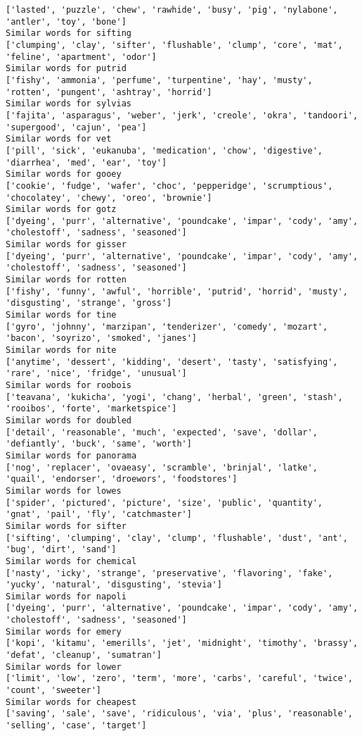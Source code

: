 \documentclass[11pt]{article}
\begin{document}
\begin{Verbatim}[commandchars=\\\{\}]
['lasted', 'puzzle', 'chew', 'rawhide', 'busy', 'pig', 'nylabone', 'antler', 'toy', 'bone']
Similar words for sifting
['clumping', 'clay', 'sifter', 'flushable', 'clump', 'core', 'mat', 'feline', 'apartment', 'odor']
Similar words for putrid
['fishy', 'ammonia', 'perfume', 'turpentine', 'hay', 'musty', 'rotten', 'pungent', 'ashtray', 'horrid']
Similar words for sylvias
['fajita', 'asparagus', 'weber', 'jerk', 'creole', 'okra', 'tandoori', 'supergood', 'cajun', 'pea']
Similar words for vet
['pill', 'sick', 'eukanuba', 'medication', 'chow', 'digestive', 'diarrhea', 'med', 'ear', 'toy']
Similar words for gooey
['cookie', 'fudge', 'wafer', 'choc', 'pepperidge', 'scrumptious', 'chocolatey', 'chewy', 'oreo', 'brownie']
Similar words for gotz
['dyeing', 'purr', 'alternative', 'poundcake', 'impar', 'cody', 'amy', 'cholestoff', 'sadness', 'seasoned']
Similar words for gisser
['dyeing', 'purr', 'alternative', 'poundcake', 'impar', 'cody', 'amy', 'cholestoff', 'sadness', 'seasoned']
Similar words for rotten
['fishy', 'funny', 'awful', 'horrible', 'putrid', 'horrid', 'musty', 'disgusting', 'strange', 'gross']
Similar words for tine
['gyro', 'johnny', 'marzipan', 'tenderizer', 'comedy', 'mozart', 'bacon', 'soyrizo', 'smoked', 'janes']
Similar words for nite
['anytime', 'dessert', 'kidding', 'desert', 'tasty', 'satisfying', 'rare', 'nice', 'fridge', 'unusual']
Similar words for roobois
['teavana', 'kukicha', 'yogi', 'chang', 'herbal', 'green', 'stash', 'rooibos', 'forte', 'marketspice']
Similar words for doubled
['detail', 'reasonable', 'much', 'expected', 'save', 'dollar', 'defiantly', 'buck', 'same', 'worth']
Similar words for panorama
['nog', 'replacer', 'ovaeasy', 'scramble', 'brinjal', 'latke', 'quail', 'endorser', 'droewors', 'foodstores']
Similar words for lowes
['spider', 'pictured', 'picture', 'size', 'public', 'quantity', 'gnat', 'pail', 'fly', 'catchmaster']
Similar words for sifter
['sifting', 'clumping', 'clay', 'clump', 'flushable', 'dust', 'ant', 'bug', 'dirt', 'sand']
Similar words for chemical
['nasty', 'icky', 'strange', 'preservative', 'flavoring', 'fake', 'yucky', 'natural', 'disgusting', 'stevia']
Similar words for napoli
['dyeing', 'purr', 'alternative', 'poundcake', 'impar', 'cody', 'amy', 'cholestoff', 'sadness', 'seasoned']
Similar words for emery
['kopi', 'kitamu', 'emerills', 'jet', 'midnight', 'timothy', 'brassy', 'defat', 'cleanup', 'sumatran']
Similar words for lower
['limit', 'low', 'zero', 'term', 'more', 'carbs', 'careful', 'twice', 'count', 'sweeter']
Similar words for cheapest
['saving', 'sale', 'save', 'ridiculous', 'via', 'plus', 'reasonable', 'selling', 'case', 'target']

\end{Verbatim}
\end{document}
